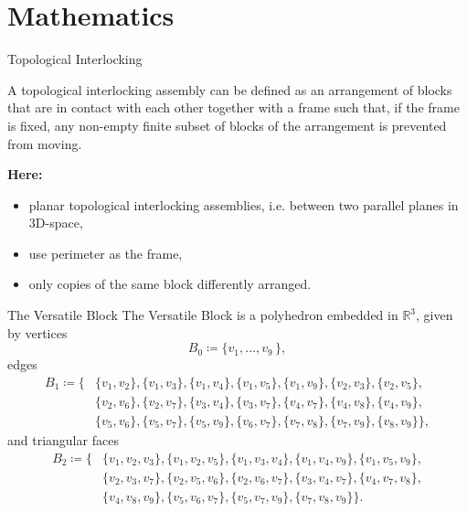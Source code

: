 \documentclass{beamer}
\numberwithin{equation}{aufgabe}
\newcommand\R{\mathbb R}
\begin{document}
\section{Mathematics}
\begin{frame}{Topological Interlocking}
    \begin{definition}
        A topological interlocking assembly can be defined as an arrangement of blocks that are in contact with each other together with a frame such that, if the frame is fixed, any non-empty finite subset of blocks of the arrangement is prevented from moving.
    \end{definition}
    \pause
    \textbf{Here:} 
    \begin{itemize}
        \item planar topological interlocking assemblies, i.e. between two parallel planes in 3D-space,
        \pause\item use perimeter as the frame,
        \pause\item only copies of the same block differently arranged.
    \end{itemize}  
\end{frame}
\begin{frame}{The Versatile Block}
    The Versatile Block is a polyhedron embedded in $\R^3$, given by \pause vertices 
    $$B_0 \coloneqq \{v_1,\ldots,v_9 \, \},$$ \pause
    edges
    \begin{align*}
        B_1 \coloneqq \{  &\{ v_1, v_2 \},  \{ v_1, v_3 \},  \{ v_1, v_4 \}, \{ v_1, v_5 \}, \{ v_1, v_9 \},  \{ v_2, v_3 \}, \{ v_2, v_5 \}, \\
        & \{ v_2, v_6 \},  \{ v_2, v_7 \},  \{ v_3, v_4 \},  \{ v_3, v_7 \},  \{ v_4, v_7 \}, \{ v_4, v_8 \}, \{ v_4, v_9 \},\\
        & \{ v_5, v_6 \}, \{ v_5, v_7 \},  \{ v_5, v_9 \}, \{ v_6, v_7 \},  \{ v_7, v_8 \},  \{ v_7, v_9 \},  \{ v_8, v_9 \}  \},
    \end{align*} \pause
    and triangular faces
    \begin{align*}
        B_2 \coloneqq \{& \{v_1, v_2, v_3\}, \{v_1, v_2, v_5\},  \{v_1, v_3, v_4\}, \{v_1, v_4, v_9\}, \{v_1, v_5, v_9\}, \\
        &\{v_2, v_3, v_7\},  \{v_2, v_5, v_6\},\{v_2, v_6, v_7\},  \{v_3, v_4, v_7\},  \{v_4, v_7, v_8\},  \\
        &\{v_4, v_8, v_9\},  \{v_5, v_6, v_7\},  \{v_5, v_7, v_9\}, \{v_7, v_8, v_9\}\}.
    \end{align*}
\end{frame}
\end{document}

